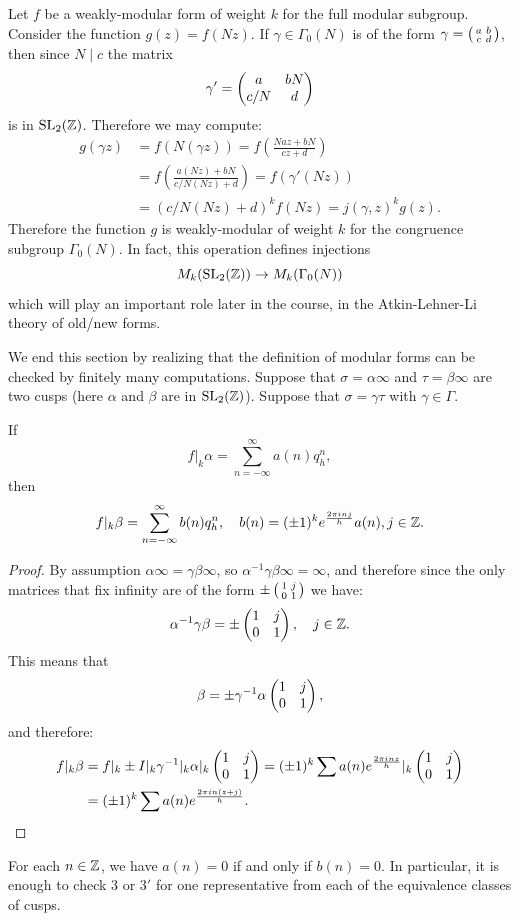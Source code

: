 \begin{example}
  Let $f$ be a weakly-modular form of weight $k$ for the full modular subgroup. Consider the function $g(z) = f(Nz)$. If $\gamma\in\Gamma_0(N)$ is of the form $\gamma=\left(\begin{smallmatrix}a&b\\c&d\end{smallmatrix}\right)$, then since $N\mid c$ the matrix
\[
\gamma'=\left(\begin{matrix}a&bN\\c/N&d\end{matrix}\right)
\]
is in $\operatorname{SL}_2(\mathbb{Z})$. Therefore we may compute:
\begin{align*}
g(\gamma z) &= f(N(\gamma z)) = f(\frac{Naz+bN}{cz+d}) \\
&= f(\frac{a(Nz)+bN}{c/N (Nz) + d}) = f(\gamma'(Nz))\\
&=(c/N(Nz) + d)^{k}f(Nz) = j(\gamma,z)^k g(z).
\end{align*}
Therefore the function $g$ is weakly-modular of weight $k$ for the congruence subgroup $\Gamma_0(N)$. In fact, this operation defines injections
\[
M_k(\operatorname{SL}_2(\mathbb{Z}))\to M_k(\Gamma_0(N))
\]
which will play an important role later in the course, in the Atkin-Lehner-Li theory of old/new forms.
\end{example}

We end this section by realizing that the definition of modular forms can be checked by finitely many computations. Suppose that $\sigma=\alpha\infty$ and $\tau=\beta\infty$ are two cusps (here $\alpha$ and $\beta$ are in $\operatorname{SL}_2(\mathbb{Z})$). Suppose that $\sigma=\gamma\tau$ with $\gamma\in\Gamma$.
\begin{proposition}
If
\[
f|_k\alpha = \sum_{n=-\infty}^\infty a(n)q_h^n,
\]
then
\[  f|_k\beta = \sum_{n=-\infty}^\infty b(n)q_h^n,\quad b(n) = (\pm 1)^k e^{\frac{2\pi i n j}{h}} a(n), j\in \mathbb{Z}.
\]
\end{proposition}
\begin{proof}
  By assumption $\alpha\infty=\gamma\beta\infty$, so $\alpha^{-1}\gamma\beta\infty=\infty$, and therefore since the only matrices that fix infinity are of the form $\pm \left(\begin{smallmatrix}1&j\\0&1\end{smallmatrix}\right)$ we have:
\[
\alpha^{-1}\gamma\beta = \pm\left(\begin{matrix}1&j\\0&1\end{matrix}\right),\quad j\in\mathbb{Z}.
\]
This means that
\[
\beta = \pm \gamma^{-1}\alpha\left(\begin{matrix}1&j\\0&1\end{matrix}\right),
\]
and therefore:
\begin{align}
f|_k\beta &= f|_k\pm I |_k \gamma^{-1} |_k\alpha |_k \left(\begin{matrix}1&j\\0&1\end{matrix}\right) = (\pm 1)^k\sum a(n)e^{\frac{2\pi i n z}{h}} |_k \left(\begin{matrix}1&j\\0&1\end{matrix}\right)\\
&=(\pm 1)^k\sum a(n) e^{\frac{2\pi i n (z+j)}{h}}.
\end{align}
\end{proof}
\begin{corollary}
  For each $n\in\mathbb{Z}$, we have $a(n)=0$ if and only if $b(n)=0$. In particular, it is enough to check $3$ or $3'$ for one representative from each of the equivalence classes of cusps.
\end{corollary}

